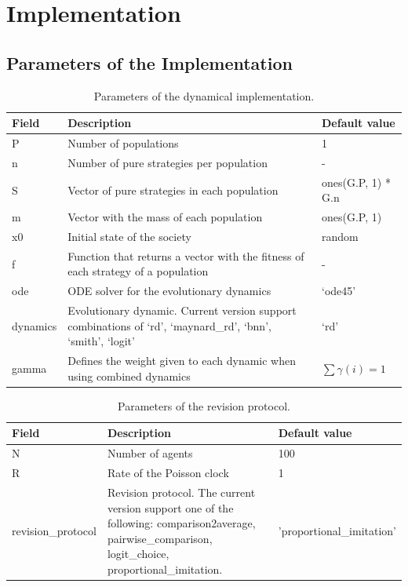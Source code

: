 \section{Implementation} \label{sec:implementation}

\subsection{Parameters of the Implementation}


\begin{table}[tbh]
\begin{center}
\begin{tabular}{l | p{} | l}\hline
Field & Description & Default value\\ \hline
P & Number of populations & 1 \\
n & Number of pure strategies per population & - \\
S & Vector of pure strategies in each population & ones(G.P, 1) * G.n \\
m & Vector with the mass of each population & ones(G.P, 1) \\
x0 & Initial state of the society & random \\
f & Function that returns a vector with the fitness of each strategy of a population & - \\
ode & ODE solver for the evolutionary dynamics & `ode45' \\
dynamics & Evolutionary dynamic. Current version support combinations of {`rd', `maynard\_rd',  `bnn', `smith',  `logit'} & `rd' \\
gamma & Defines the weight given to each dynamic when using combined dynamics &  $\sum \gamma(i) = 1$ \\ \hline
\end{tabular}
\end{center}
\caption{Parameters of the dynamical implementation.}
\label{tab:req_a}
\end{table}




\begin{table}[tbh]
\begin{center}
\begin{tabular}{l| p{} |l}\hline
Field & Description & Default value \\ \hline
N & Number of agents & 100 \\
R & Rate of the Poisson clock & 1 \\
revision\_protocol & Revision protocol. The current version support one of the following: comparison2average, pairwise\_comparison, logit\_choice, proportional\_imitation. & 'proportional\_imitation' \\ \hline
\end{tabular}
\end{center}
\caption{Parameters of the revision protocol.}
\label{tab:req_b}
\end{table}




